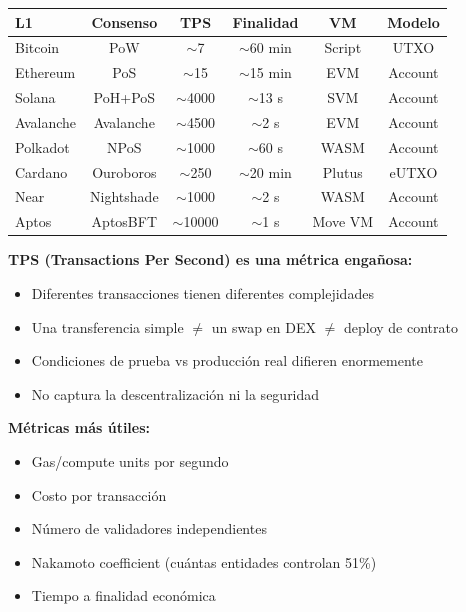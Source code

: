 \documentclass[11pt,a4paper,twoside,openright]{book}
\theoremstyle{definition}
\theoremstyle{plain}
\theoremstyle{remark}
\begin{document}
\begin{center}
\begin{tabular}{lccccc}
\toprule
\textbf{L1} & \textbf{Consenso} & \textbf{TPS} & \textbf{Finalidad} & \textbf{VM} & \textbf{Modelo} \\
\midrule
Bitcoin & PoW & $\sim$7 & $\sim$60 min & Script & UTXO \\
Ethereum & PoS & $\sim$15 & $\sim$15 min & EVM & Account \\
Solana & PoH+PoS & $\sim$4000 & $\sim$13 s & SVM & Account \\
Avalanche & Avalanche & $\sim$4500 & $\sim$2 s & EVM & Account \\
Polkadot & NPoS & $\sim$1000 & $\sim$60 s & WASM & Account \\
Cardano & Ouroboros & $\sim$250 & $\sim$20 min & Plutus & eUTXO \\
Near & Nightshade & $\sim$1000 & $\sim$2 s & WASM & Account \\
Aptos & AptosBFT & $\sim$10000 & $\sim$1 s & Move VM & Account \\
\bottomrule
\end{tabular}
\end{center}

\begin{advertencia}
\textbf{TPS (Transactions Per Second) es una métrica engañosa:}

\begin{itemize}
    \item Diferentes transacciones tienen diferentes complejidades
    \item Una transferencia simple $\neq$ un swap en DEX $\neq$ deploy de contrato
    \item Condiciones de prueba vs producción real difieren enormemente
    \item No captura la descentralización ni la seguridad
\end{itemize}

\textbf{Métricas más útiles:}
\begin{itemize}
    \item Gas/compute units por segundo
    \item Costo por transacción
    \item Número de validadores independientes
    \item Nakamoto coefficient (cuántas entidades controlan 51\%)
    \item Tiempo a finalidad económica
\end{itemize}
\end{advertencia}
\end{document}
